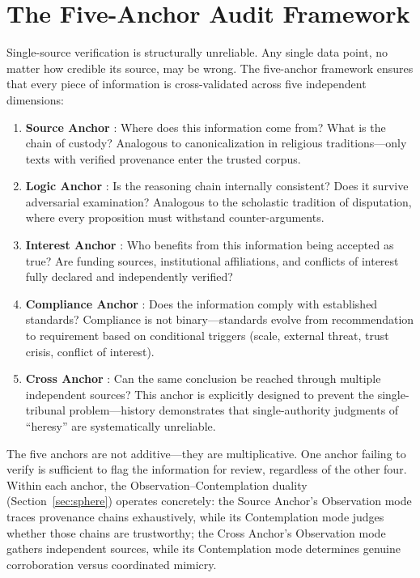 \documentclass[11pt]{article}
\begin{document}
\section{The Five-Anchor Audit Framework}
\label{sec:five-anchor}

Single-source verification is structurally unreliable. Any single data point, no 
matter how credible its source, may be wrong. The five-anchor framework ensures 
that every piece of information is cross-validated across five independent dimensions:

\begin{enumerate}
  \item \textbf{Source Anchor} : Where does this information come from? 
    What is the chain of custody? Analogous to canonicalization in religious traditions---only 
    texts with verified provenance enter the trusted corpus.
  
  \item \textbf{Logic Anchor} : Is the reasoning chain internally consistent? 
    Does it survive adversarial examination? Analogous to the scholastic tradition of 
    disputation, where every proposition must withstand counter-arguments.
  
  \item \textbf{Interest Anchor} : Who benefits from this information being 
    accepted as true? Are funding sources, institutional affiliations, and conflicts of 
    interest fully declared and independently verified?
  
  \item \textbf{Compliance Anchor} : Does the information comply with 
    established standards? Compliance is not binary---standards evolve from recommendation 
    to requirement based on conditional triggers (scale, external threat, trust crisis, 
    conflict of interest).
  
  \item \textbf{Cross Anchor} : Can the same conclusion be reached through 
    multiple independent sources? This anchor is explicitly designed to prevent the 
    single-tribunal problem---history demonstrates that single-authority judgments of 
    ``heresy'' are systematically unreliable.
\end{enumerate}

The five anchors are not additive---they are multiplicative. One anchor failing to 
verify is sufficient to flag the information for review, regardless of the other four.
Within each anchor, the Observation--Contemplation duality (Section~\ref{sec:sphere})
operates concretely: the Source Anchor's Observation mode traces provenance chains
exhaustively, while its Contemplation mode judges whether those chains are trustworthy;
the Cross Anchor's Observation mode gathers independent sources, while its
Contemplation mode determines genuine corroboration versus coordinated mimicry.
\end{document}
